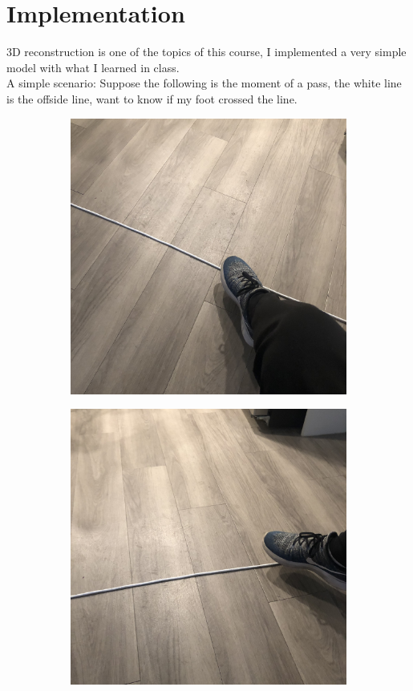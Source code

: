\documentclass[12pt]{article}
\begin{document}
	\section{Implementation}
	3D reconstruction is one of the topics of this course, I implemented a very simple model with what I learned in class.\\
	A simple scenario: Suppose the following is the moment of a pass, the white line is the offside line, want to know if my foot crossed the line.
	\begin{figure}[ht!]
		\centering
		\begin{subfigure}[b]{0.4\textwidth}
			\includegraphics[width=\textwidth]{pic5.jpg}
		\end{subfigure}
		\begin{subfigure}[b]{0.4\textwidth}
			\includegraphics[width=\textwidth]{pic6.jpg}

\end{subfigure}
\end{figure}
\end{document}

